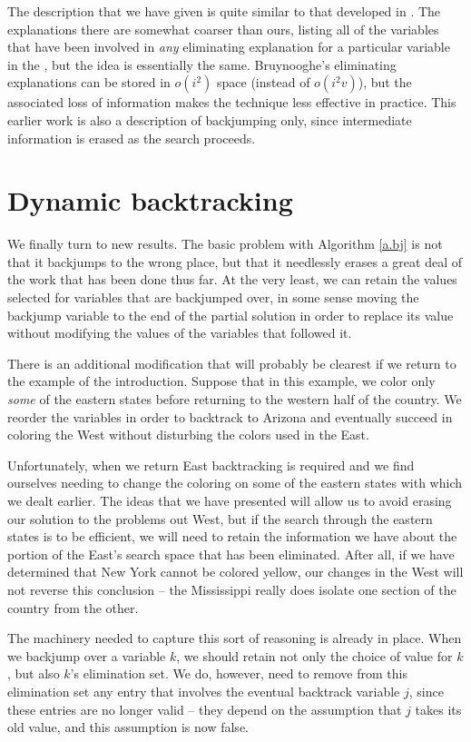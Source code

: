 The description that we have given is quite similar to that developed
in \cite{Bruynooghe:backtrack}.  The explanations there are somewhat
coarser than ours, listing all of the variables that have been
involved in {\em any\/} eliminating explanation for a particular
variable in the \csp, but the idea is essentially the same.
Bruynooghe's eliminating explanations can be stored in $o(i^2)$ space
(instead of $o(i^2v)$), but the associated loss of information makes
the technique less effective in practice.  This earlier work is also a
description of backjumping only, since intermediate information is
erased as the search proceeds.

\section{Dynamic backtracking}
\label{s.dynamic}

We finally turn to new results.  The basic problem with Algorithm
\ref{a.bj} is not that it backjumps to the wrong place, but that it
needlessly erases a great deal of the work that has been done thus
far.  At the very least, we can retain the values selected for
variables that are backjumped over, in some sense moving the backjump
variable to the end of the partial solution in order to replace its
value without modifying the values of the variables that followed it.

There is an additional modification that will probably be clearest if
we return to the example of the introduction.  Suppose that in this
example, we color only {\em some\/} of the eastern states before
returning to the western half of the country.  We reorder the
variables in order to backtrack to Arizona and eventually succeed in
coloring the West without disturbing the colors used in the East.

Unfortunately, when we return East backtracking is required and we
find ourselves needing to change the coloring on some of the eastern
states with which we dealt earlier.  The ideas that we have presented
will allow us to avoid erasing our solution to the problems out West,
but if the search through the eastern states is to be efficient, we
will need to retain the information we have about the portion of the
East's search space that has been eliminated.  After all, if we have
determined that New York cannot be colored yellow, our changes in the
West will not reverse this conclusion -- the Mississippi really does
isolate one section of the country from the other.

The machinery needed to capture this sort of reasoning is already in
place.  When we backjump over a variable $k$, we should retain not
only the choice of value for $k$, but also $k$'s elimination set.  We
do, however, need to remove from this elimination set any entry that
involves the eventual backtrack variable $j$, since these entries are
no longer valid -- they depend on the assumption that $j$ takes its
old value, and this assumption is now false.

